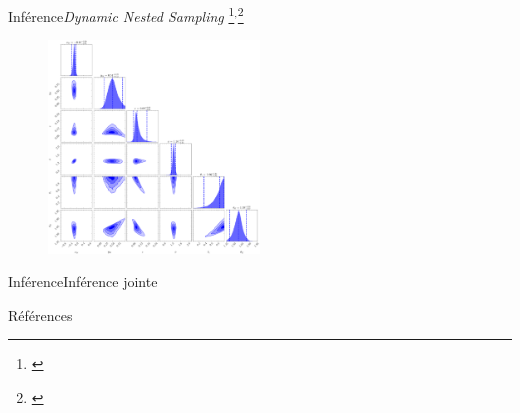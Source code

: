 \documentclass{beamer}
\begin{document}
\begin{frame}{Inférence}{\textit{Dynamic Nested Sampling}
        \footnote{\citet{Skilling2006}}$^{,}$\footnote{\citet{Higson2017}}}
        \begin{figure}[H]
                \centering
                \includegraphics[width=0.5\textwidth]{corner_plot}
        \end{figure}
         
\end{frame}

\begin{frame}{Inférence}{Inférence jointe}
        
\end{frame}


\begin{frame}[allowframebreaks]{Références}
        
        
\end{frame}
\end{document}
